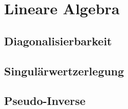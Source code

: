 
\section{Lineare Algebra}










\subsection{Diagonalisierbarkeit}

\subsection{Singulärwertzerlegung}

\subsection{Pseudo-Inverse}